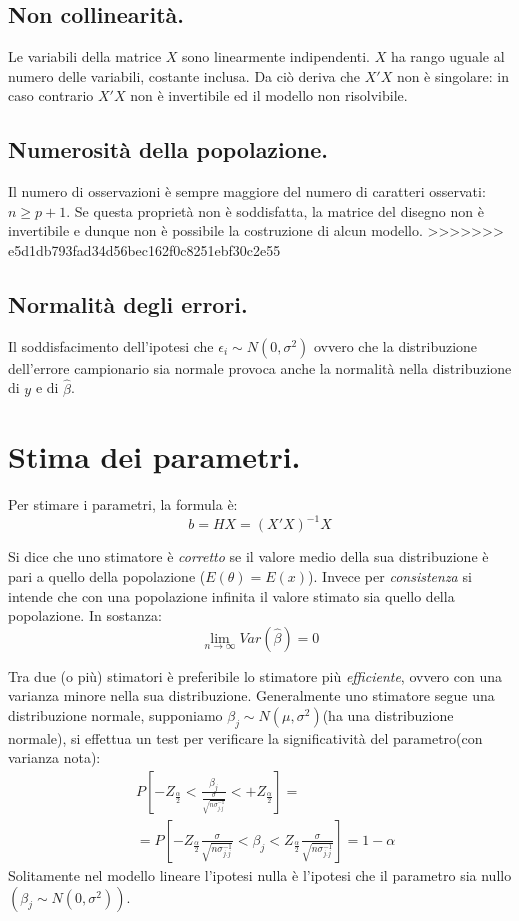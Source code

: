 \documentclass[11pt, twocolumn]{article}
\begin{document}
\subsection*{Non collinearità.}
Le variabili della matrice $X$ sono linearmente indipendenti. $X$ ha rango uguale al numero delle variabili, costante inclusa. Da ciò deriva che $X'X$ non è singolare: in caso contrario $X'X$ non è invertibile ed il modello non risolvibile.

\subsection*{Numerosità della popolazione.}
Il numero di osservazioni è sempre maggiore del numero di caratteri osservati: $n \geq p + 1$.
Se questa proprietà non è soddisfatta, la matrice del disegno non è invertibile e dunque non è possibile la costruzione di alcun modello.
>>>>>>> e5d1db793fad34d56bec162f0c8251ebf30c2e55

\subsection*{Normalità degli errori.}
Il soddisfacimento dell'ipotesi che $\epsilon_i \sim N(0,\sigma^2)$ ovvero che la distribuzione dell’errore campionario sia normale provoca anche la normalità nella distribuzione di $y$ e di $\hat{\beta}$.

\section{Stima dei parametri.}
Per stimare i parametri, la formula è:
\begin{equation*}
  b = HX = (X'X)^{-1}X
\end{equation*}

Si dice che uno stimatore è \textit{corretto} se il valore medio della sua distribuzione è pari a quello della popolazione ($E(\theta) = E(x)$).
Invece per \textit{consistenza} si intende che con una popolazione infinita il valore stimato sia quello della popolazione.
In sostanza:
$$\lim_{n\to\infty} Var(\hat{\beta}) = 0$$

Tra due (o più) stimatori è preferibile lo stimatore più \textit{efficiente}, ovvero con una varianza minore nella sua distribuzione.
Generalmente uno stimatore segue una distribuzione normale, supponiamo $\beta_j \sim N(\mu,\sigma^2)$(ha una distribuzione normale), si effettua un test per verificare la significatività del parametro(con varianza nota):
\begin{align*}
  &P[-Z_{\frac{\alpha}{2}} < \frac{\beta_j}{\frac{\sigma}{\sqrt{n\sigma^{-1}_{j.j}}}} < +Z_{\frac{\alpha}{2}}] = \\
  &= P[-Z_{\frac{\alpha}{2}} \frac{\sigma}{\sqrt{n\sigma^{-1}_{j.j}}} < \beta_j < Z_{\frac{\alpha}{2}} \frac{\sigma}{\sqrt{n\sigma^{-1}_{j.j}}}] = 1 - \alpha
\end{align*}
Solitamente nel modello lineare l'ipotesi nulla è l'ipotesi che il parametro sia nullo $(\beta_j \sim N(0,\sigma^2))$.
\end{document}
